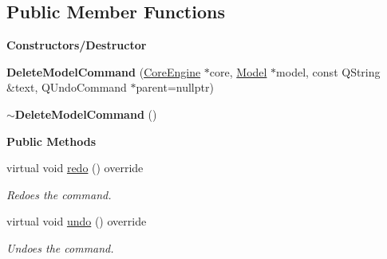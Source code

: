 \subsection*{Public Member Functions}
\begin{Indent}\textbf{ Constructors/\+Destructor}\par
\begin{DoxyCompactItemize}
\item 
\mbox{\label{classrev_1_1_delete_model_command_a98170f731f9c94e12d1be242abd623e0}} 
{\bfseries Delete\+Model\+Command} (\mbox{\hyperlink{classrev_1_1_core_engine}{Core\+Engine}} $\ast$core, \mbox{\hyperlink{classrev_1_1_model}{Model}} $\ast$model, const Q\+String \&text, Q\+Undo\+Command $\ast$parent=nullptr)
\item 
\mbox{\label{classrev_1_1_delete_model_command_a2e686aa7a573ecdd79248065d81006ea}} 
{\bfseries $\sim$\+Delete\+Model\+Command} ()
\end{DoxyCompactItemize}
\end{Indent}
\begin{Indent}\textbf{ Public Methods}\par
\begin{DoxyCompactItemize}
\item 
\mbox{\label{classrev_1_1_delete_model_command_acf6418b5408f4546c833b3c0ae71b16a}} 
virtual void \mbox{\hyperlink{classrev_1_1_delete_model_command_acf6418b5408f4546c833b3c0ae71b16a}{redo}} () override
\begin{DoxyCompactList}\small\item\em Redoes the command. \end{DoxyCompactList}\item 
\mbox{\label{classrev_1_1_delete_model_command_a2e3963f47d868836858082b0770073c1}} 
virtual void \mbox{\hyperlink{classrev_1_1_delete_model_command_a2e3963f47d868836858082b0770073c1}{undo}} () override
\begin{DoxyCompactList}\small\item\em Undoes the command. \end{DoxyCompactList}\end{DoxyCompactItemize}
\end{Indent}
